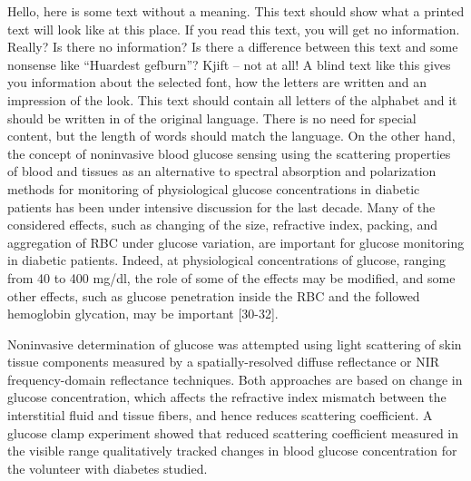 Hello, here is some text without a meaning. 
    This text should show what a printed text will look like at this
    place. If you read this text, you will get no
    information. Really? Is there no information?
    Is there a difference between this text and some nonsense like
    ``Huardest gefburn''? Kjift -- not at all! A blind text
    like this gives you information  about the selected
    font, how the letters are written and an impression  of the
    look. This text should contain {all
    letters of the alphabet} and it should be written in of the original
    language. There is no need for  special
    content, but the length of words should match the
    language.
On the other hand, the concept of noninvasive blood glucose
sensing using the scattering properties of blood and tissues as an
alternative to spectral absorption and polarization methods for
monitoring of physiological glucose concentrations in diabetic
patients has been under intensive discussion for the last decade.
Many of the considered  effects, such as changing of the size,
refractive index, packing, and aggregation of RBC under glucose
variation, are important for glucose monitoring in diabetic
patients. Indeed, at physiological concentrations of glucose,
ranging from 40 to 400 mg/dl, the role of some of the effects may
be modified, and some other effects, such as glucose penetration
inside the RBC and the followed hemoglobin glycation, may be
important [30-32].

Noninvasive determination of glucose was attempted using light
scattering of skin tissue components measured by a
spatially-resolved diffuse reflectance or NIR fre\-quen\-cy-domain
reflectance techniques. Both approaches are based on change in
glucose concentration, which affects the refractive index mismatch
between the interstitial fluid and tissue fibers, and hence
reduces scattering coefficient. A glucose clamp experiment showed
that reduced scattering coefficient measured in the visible range
qualitatively tracked changes in blood glucose concentration for
the volunteer with diabetes studied.



